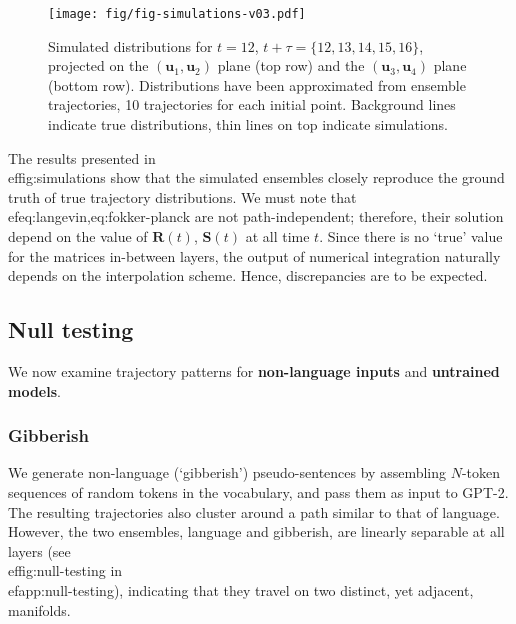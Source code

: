 \documentclass{article} %
\def\vu{{\bm{u}}}
\def\mR{{\bm{R}}}
\def\mS{{\bm{S}}}
\begin{document}
\begin{figure}[ht]
\vskip 0.2in
\begin{center}
\centerline{\texttt{[image: fig/fig-simulations-v03.pdf]}}
\caption{
Simulated distributions for $t=12$, $t+\tau = \{ 12, 13, 14, 15, 16\}$, projected on 
the $\left( \vu_1,\vu_2\right)$ plane (top row) and the $\left( \vu_3,\vu_4\right)$ plane (bottom row).
Distributions have been approximated from ensemble trajectories, 10 trajectories for each initial point. 
Background lines indicate true distributions, thin lines on top indicate simulations. 
}
\label{fig:simulations}
\end{center}
\vskip -0.2in
\end{figure}

The results presented in \\ef{fig:simulations} show that the simulated ensembles closely reproduce the ground truth of true trajectory distributions. 
We must note that \\ef{eq:langevin,eq:fokker-planck} are not path-independent; therefore, their solution depend on the value of $\mR(t)$, $\mS(t)$ at all time $t$. Since there is no `true' value for the matrices in-between layers, the output of numerical integration naturally depends on the interpolation scheme. Hence, discrepancies are to be expected. 

\subsection{Null testing}
We now examine trajectory patterns for \textbf{non-language inputs} and \textbf{untrained models}.

\subsubsection{Gibberish}
We generate non-language (`gibberish') pseudo-sentences by assembling $N$-token sequences of random tokens in the vocabulary, and pass them as input to GPT-2.
The resulting trajectories also cluster around a path similar to that of language.
However, the two ensembles, language and gibberish, are linearly separable at all layers (see \\ef{fig:null-testing} in \\ef{app:null-testing}), indicating that they travel on two distinct, yet adjacent, manifolds.
\end{document}

